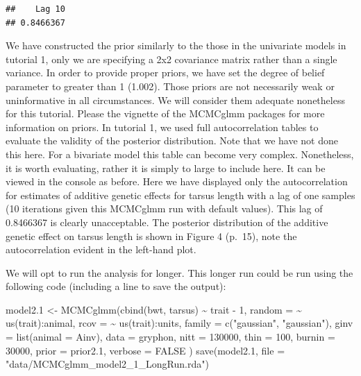 \documentclass[
  12pt,
]{book}
\newenvironment{Shaded}{\begin{snugshade}}{\end{snugshade}}
\newcommand{\AttributeTok}[1]{\textcolor[rgb]{0.77,0.63,0.00}{#1}}
\newcommand{\ConstantTok}[1]{\textcolor[rgb]{0.00,0.00,0.00}{#1}}
\newcommand{\DecValTok}[1]{\textcolor[rgb]{0.00,0.00,0.81}{#1}}
\newcommand{\FloatTok}[1]{\textcolor[rgb]{0.00,0.00,0.81}{#1}}
\newcommand{\FunctionTok}[1]{\textcolor[rgb]{0.00,0.00,0.00}{#1}}
\newcommand{\NormalTok}[1]{#1}
\newcommand{\OtherTok}[1]{\textcolor[rgb]{0.56,0.35,0.01}{#1}}
\newcommand{\SpecialCharTok}[1]{\textcolor[rgb]{0.00,0.00,0.00}{#1}}
\newcommand{\StringTok}[1]{\textcolor[rgb]{0.31,0.60,0.02}{#1}}
\begin{document}
\begin{verbatim}
##    Lag 10 
## 0.8466367
\end{verbatim}

We have constructed the prior similarly to the those in the univariate models in tutorial 1, only we are specifying a 2x2 covariance matrix rather than a single variance. In order to provide proper priors, we have set the degree of belief parameter to greater than 1 (1.002). Those priors are not necessarily weak or uninformative in all circumstances. We will consider them adequate nonetheless for this tutorial. Please the vignette of the MCMCglmm packages \citep{R-MCMCglmm} for more information on priors. In tutorial 1, we used full autocorrelation tables to evaluate the validity of the posterior distribution. Note that we have not done this here.
For a bivariate model this table can become very complex. Nonetheless, it is worth evaluating, rather it is simply to large to include here. It can be viewed in the console as before. Here we have displayed only the autocorrelation for estimates of additive genetic effects for tarsus length with a lag of one samples (10 iterations given this MCMCglmm run with default values). This lag of 0.8466367 is clearly unacceptable. The posterior distribution of the additive genetic effect on tarsus length is shown in Figure 4 (p.~15), note the autocorrelation evident in the left-hand plot.

We will opt to run the analysis for longer. This longer run could be run using the following code (including a line to save the output):

\begin{Shaded}
\begin{Highlighting}[]
\NormalTok{model2}\FloatTok{.1} \OtherTok{\textless{}{-}} \FunctionTok{MCMCglmm}\NormalTok{(}\FunctionTok{cbind}\NormalTok{(bwt, tarsus) }\SpecialCharTok{\textasciitilde{}}\NormalTok{ trait }\SpecialCharTok{{-}} \DecValTok{1}\NormalTok{,}
  \AttributeTok{random =} \SpecialCharTok{\textasciitilde{}} \FunctionTok{us}\NormalTok{(trait)}\SpecialCharTok{:}\NormalTok{animal,}
  \AttributeTok{rcov =} \SpecialCharTok{\textasciitilde{}} \FunctionTok{us}\NormalTok{(trait)}\SpecialCharTok{:}\NormalTok{units,}
  \AttributeTok{family =} \FunctionTok{c}\NormalTok{(}\StringTok{"gaussian"}\NormalTok{, }\StringTok{"gaussian"}\NormalTok{),}
  \AttributeTok{ginv =} \FunctionTok{list}\NormalTok{(}\AttributeTok{animal =}\NormalTok{ Ainv),}
  \AttributeTok{data =}\NormalTok{ gryphon,}
  \AttributeTok{nitt =} \DecValTok{130000}\NormalTok{, }\AttributeTok{thin =} \DecValTok{100}\NormalTok{, }\AttributeTok{burnin =} \DecValTok{30000}\NormalTok{,}
  \AttributeTok{prior =}\NormalTok{ prior2}\FloatTok{.1}\NormalTok{, }\AttributeTok{verbose =} \ConstantTok{FALSE}
\NormalTok{)}
\FunctionTok{save}\NormalTok{(model2}\FloatTok{.1}\NormalTok{, }\AttributeTok{file =} \StringTok{"data/MCMCglmm\_model2\_1\_LongRun.rda"}\NormalTok{)}
\end{Highlighting}
\end{Shaded}
\end{document}
